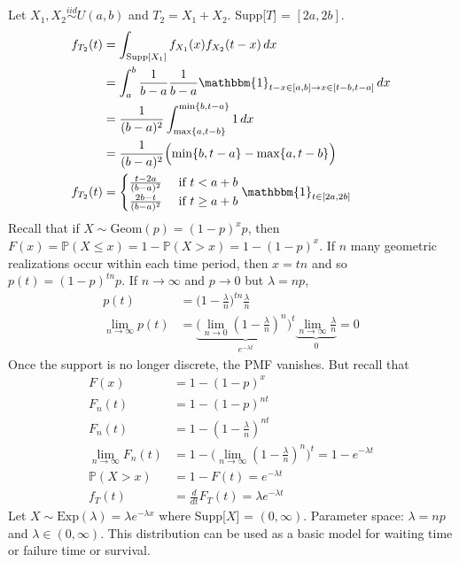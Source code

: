 \documentclass[12pt]{article}
\newcommand{\prob}[1]{\mathbb{P}(#1)}
\newcommand{\indicator}[1]{\mathbbm{1}_{#1}}
\newcommand{\iid}{\stackrel{iid}{\sim}}
\renewcommand{\max}[1]{\text{max}\{#1\}}
\renewcommand{\min}[1]{\text{min}\{#1\}}
\begin{document}
Let $X_1, X_2 \iid U(a, b)$ and $T_2 = X_1 + X_2$. Supp[$T$] = $[2a, 2b]$. $$\begin{aligned} f_{T_2}(t) &= \int_{\text{Supp}[X_1]} f_{X_1}(x)f_{X_2}(t - x) \, dx \\ &= \int_a^b \frac{1}{b -a}\frac{1}{b - a} \indicator{t - x \in [a, b] \to x \in [t - b, t - a]} \, dx \\ &= \frac{1}{(b - a)^2} \int_{\max{a, t - b}}^{\min{b, t - a}} 1 \, dx \\ &= \frac{1}{(b - a)^2} \Big(\min{b, t - a} - \max{a, t - b}\Big) \\ f_{T_2}(t) &= \begin{cases} \frac{t - 2a}{(b - a)^2} &\text{ if } t < a + b \\ \frac{2b - t}{(b - a)^2} &\text{ if } t \geq a + b \end{cases} \indicator{t \in [2a, 2b]} \end{aligned} $$ 
Recall that if $X \sim \text{Geom}(p) = (1 - p)^xp$, then $F(x) = \prob{X \leq x} = 1 - \prob{X > x} = 1 - (1 - p)^x$. If $n$ many geometric realizations occur within each time period, then $x = tn$ and so $p(t) = (1 - p)^{tn}p$. If $n \to \infty$ and $p \to 0$ but $\lambda = np$, $$\begin{aligned} p(t) &= \Big( 1 - \frac{\lambda}{n}\Big)^{tn} \frac{\lambda}{n} \\ \lim_{n \to \infty} p(t) &= \underbrace{\Big(\lim_{n \to 0} (1 - \frac{\lambda}{n})^n\Big)^t}_{e^{-\lambda t}} \underbrace{\lim_{n \to \infty} \frac{\lambda}{n}}_0 = 0 \end{aligned} $$ Once the support is no longer discrete, the PMF vanishes. But recall that $$\begin{aligned} F(x) &= 1 - (1 - p)^x \\ F_n(t) &= 1 - (1 - p)^{nt} \\ F_n(t) &= 1 - (1 - \frac{\lambda}{n})^{nt} \\ \lim_{n \to \infty} F_n(t) &= 1 - \Big( \lim_{n \to \infty} (1 - \frac{\lambda}{n})^n\Big)^t = 1 - e^{-\lambda t} \\ \prob{X > x} &= 1 - F(t) = e^{-\lambda t} \\ f_T(t) &= \frac{d}{dt} F_T(t) = \lambda e^{-\lambda t} \end{aligned} $$ 
Let $X \sim \text{Exp}(\lambda) = \lambda e^{-\lambda x}$ where Supp[$X$] = $(0, \infty)$. Parameter space: $\lambda = np$ and $\lambda \in (0, \infty)$. This distribution can be used as a basic model for waiting time or failure time or survival. \\~\\
\end{document}
